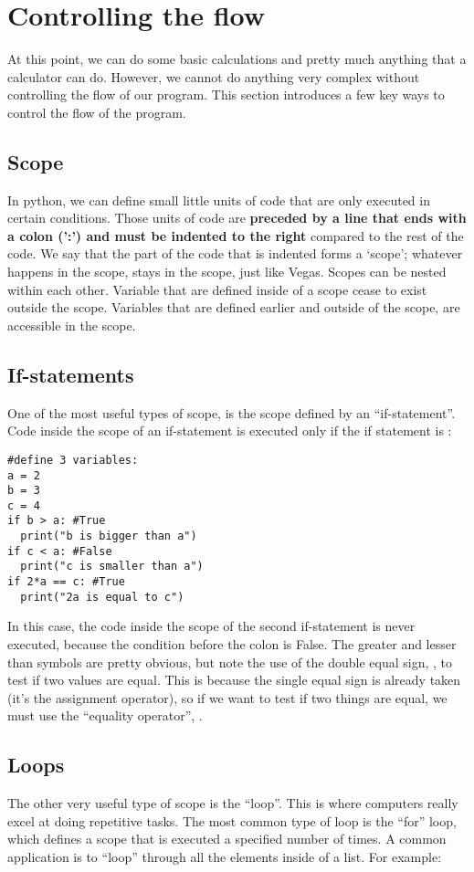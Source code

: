 \section{Controlling the flow}
At this point, we can do some basic calculations and pretty much anything that a calculator can do. However, we cannot do anything very complex without controlling the flow of our program. This section introduces a few key ways to control the flow of the program.
\subsection{Scope}
In python, we can define small little units of code that are only executed in certain conditions. Those units of code are \textbf{preceded by a line that ends with a colon (':') and must be indented to the right} compared to the rest of the code. We say that the part of the code that is indented forms a `scope';  whatever happens in the scope, stays in the scope, just like Vegas. Scopes can be nested within each other. Variable that are defined inside of a scope cease to exist outside the scope. Variables that are defined earlier and outside of the scope, are accessible in the scope. 

\subsection{If-statements}
One of the most useful types of scope, is the scope defined by an ``if-statement''. Code inside the scope of an if-statement is executed only if the if statement is :
\begin{lstlisting}[frame=single] 
#define 3 variables:
a = 2 
b = 3
c = 4
if b > a: #True
  print("b is bigger than a")
if c < a: #False
  print("c is smaller than a")
if 2*a == c: #True
  print("2a is equal to c")
\end{lstlisting}
In this case, the code inside the scope of the second if-statement is never executed, because the condition before the colon is False. The greater and lesser than symbols are pretty obvious, but note the use of the double equal sign, \code{==}, to test if two values are equal. This is because the single equal sign is already taken (it's the assignment operator), so if we want to test if two things are equal, we must use the ``equality operator'', \code{==}.

\subsection{Loops}
The other very useful type of scope is the ``loop''. This is where computers really excel at doing repetitive tasks. The most common type of loop is the ``for'' loop, which defines a scope that is executed a specified number of times. A common application is to ``loop'' through all the elements inside of a list. For example:

